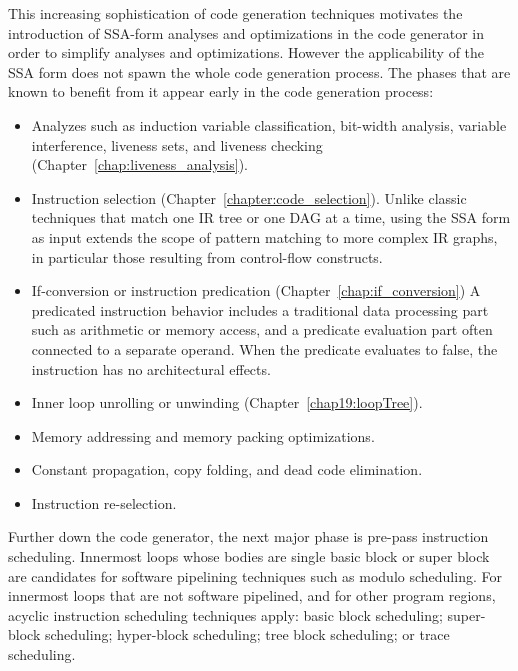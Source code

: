 This increasing sophistication of code generation techniques motivates the
introduction of SSA-form analyses and optimizations in the code generator in
order to simplify analyses and optimizations. However the applicability of the SSA
form does not spawn the whole code generation process. The phases that are known
to benefit from it appear early in the code generation process:
\begin{itemize}

\item Analyzes such as induction variable classification, bit-width analysis,
variable interference, liveness sets, and liveness checking
(Chapter~\ref{chap:liveness_analysis}).

\item Instruction selection (Chapter~\ref{chapter:code_selection}). Unlike
classic techniques that match one IR tree or one DAG at a time, using the SSA
form as input extends the scope of pattern matching to more complex IR graphs,
in particular those resulting from control-flow constructs.

\item If-conversion or instruction predication (Chapter~\ref{chap:if_conversion})
A predicated instruction behavior includes a traditional data processing part
such as arithmetic or memory access, and a predicate evaluation part often
connected to a separate operand. When the predicate evaluates to false, the
instruction has no architectural effects.

\item Inner loop unrolling or unwinding (Chapter~\ref{chap19:loopTree}).

\item Memory addressing and memory packing optimizations.

\item Constant propagation, copy folding, and dead code elimination.

\item Instruction re-selection.

\end{itemize} \medskip

Further down the code generator, the next major phase is pre-pass instruction
scheduling. Innermost loops whose bodies are single basic block or super
block are candidates for software pipelining techniques such as modulo
scheduling. For innermost loops that are not software pipelined, and for other
program regions, acyclic instruction scheduling techniques apply: basic block
scheduling; super-block scheduling; hyper-block scheduling; tree block
scheduling; or trace scheduling.


